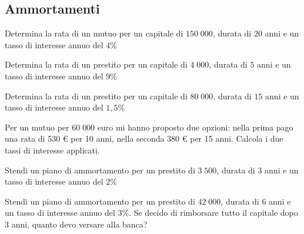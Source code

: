 \subsection{Ammortamenti}
\begin{esercizio}
Determina la rata di un mutuo per un capitale di $150\;000$, durata di $20$ anni e un tasso di interesse annuo del $4\%$
\end{esercizio}
\begin{esercizio}
Determina la rata di un prestito per un capitale di $4\;000$, durata di $5$ anni e un tasso di interesse annuo del $9\%$
\end{esercizio}
\begin{esercizio}
Determina la rata di un prestito per un capitale di $80\;000$, durata di $15$ anni e un tasso di interesse annuo del $1,5\%$
\end{esercizio}
\begin{esercizio}
Per un mutuo per $60\;000$ euro mi hanno proposto due opzioni: nella prima pago una rata di 530 € per 10 anni, nella seconda 380 € per 15 anni. Calcola i due tassi di interesse applicati.
\end{esercizio}


\begin{esercizio}
Stendi un piano di ammortamento per un prestito di $3\;500$, durata di $3$ anni e un tasso di interesse annuo del $2\%$
\end{esercizio}
\begin{esercizio}
Stendi un piano di ammortamento per un prestito di $42\;000$, durata di $6$ anni e un tasso di interesse annuo del $3\%$. Se decido di rimborsare tutto il capitale dopo 3 anni, quanto devo versare alla banca?
\end{esercizio}
